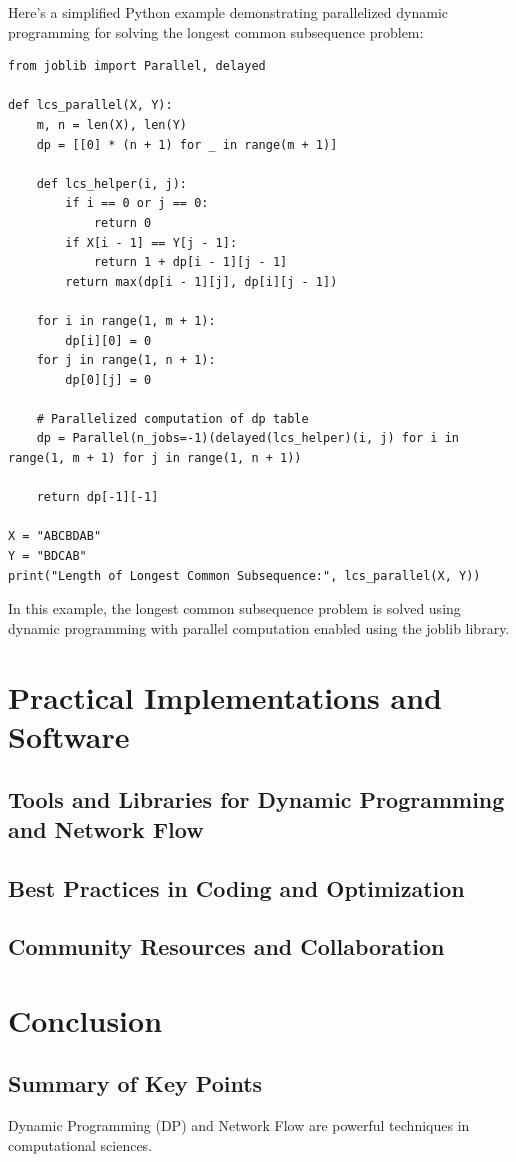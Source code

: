 \documentclass[12pt]{book} %
\begin{document}
Here's a simplified Python example demonstrating parallelized dynamic programming for solving the longest common subsequence problem:
\FloatBarrier
\begin{lstlisting}
from joblib import Parallel, delayed

def lcs_parallel(X, Y):
    m, n = len(X), len(Y)
    dp = [[0] * (n + 1) for _ in range(m + 1)]
    
    def lcs_helper(i, j):
        if i == 0 or j == 0:
            return 0
        if X[i - 1] == Y[j - 1]:
            return 1 + dp[i - 1][j - 1]
        return max(dp[i - 1][j], dp[i][j - 1])
    
    for i in range(1, m + 1):
        dp[i][0] = 0
    for j in range(1, n + 1):
        dp[0][j] = 0
    
    # Parallelized computation of dp table
    dp = Parallel(n_jobs=-1)(delayed(lcs_helper)(i, j) for i in range(1, m + 1) for j in range(1, n + 1))
    
    return dp[-1][-1]

X = "ABCBDAB"
Y = "BDCAB"
print("Length of Longest Common Subsequence:", lcs_parallel(X, Y))
\end{lstlisting}
\FloatBarrier
In this example, the longest common subsequence problem is solved using dynamic programming with parallel computation enabled using the joblib library.

\section{Practical Implementations and Software}
\subsection{Tools and Libraries for Dynamic Programming and Network Flow}
\subsection{Best Practices in Coding and Optimization}
\subsection{Community Resources and Collaboration}

\section{Conclusion}

\subsection{Summary of Key Points}
Dynamic Programming (DP) and Network Flow are powerful techniques in computational sciences.
\end{document}
